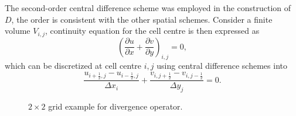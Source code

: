 \documentclass{article}
\numberwithin{equation}{section}
\begin{document}
The second-order central difference scheme was employed in the construction of $D$, the order is consistent with the other spatial schemes. Consider a finite volume $V_{i,j}$, continuity equation for the cell centre is then expressed as
\begin{equation*}
	\left(\frac{\partial u}{\partial x} + \frac{\partial v}{\partial y}\right)_{i,j}=0,
\end{equation*}
which can be discretized at cell centre $i,j$ using central difference schemes into
\begin{equation*}
  \frac{u_{i+\frac{1}{2},j} - u_{i-\frac{1}{2},j}}{\Delta x_i}+  \frac{v_{i,j+\frac{1}{2}} - v_{i,j-\frac{1}{2}}}{\Delta y_j}=0.
\end{equation*}

\begin{figure}[H] %
  \caption{$2\times 2$ grid example for divergence operator.}\label{fig:D-example-2x2}
\end{figure}
\end{document}
